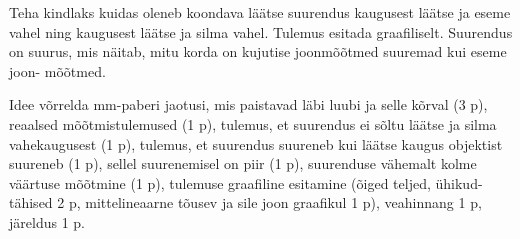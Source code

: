 
Teha kindlaks kuidas oleneb koondava läätse suurendus kaugusest läätse ja eseme vahel ning kaugusest läätse ja silma vahel. Tulemus esitada graafiliselt. Suurendus on suurus, mis näitab, mitu korda on kujutise joonmõõtmed suuremad kui eseme joon- mõõtmed.

\hint

\solu
Idee võrrelda mm-paberi jaotusi, mis paistavad läbi luubi ja selle kõrval (3 p), reaalsed mõõtmistulemused (1 p), tulemus, et suurendus ei sõltu läätse ja silma vahekaugusest (1 p), tulemus, et suurendus suureneb kui läätse kaugus objektist suureneb (1 p), sellel suurenemisel on piir (1 p), suurenduse vähemalt kolme väärtuse mõõtmine (1 p), tulemuse graafiline esitamine (õiged teljed, ühikud-tähised 2 p, mittelineaarne tõusev ja sile joon graafikul 1 p), veahinnang 1 p, järeldus 1 p.
\probend
